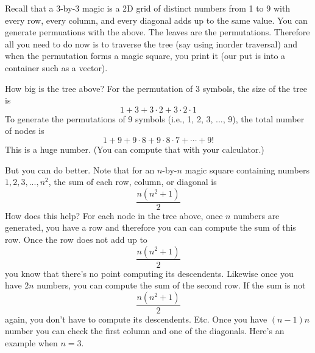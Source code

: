 Recall that a 3-by-3  magic is a 2D grid of distinct numbers
from 1 to 9 with every row,
every column, and every diagonal adds up to the same value.
You can generate permuations with the above.
The leaves are the permutations.
Therefore all you need to do now is to traverse the tree (say using
inorder traversal) and when the permutation forms a magic square,
you print it (our put is into a container such as a vector).

How big is the tree above?
For the permutation of 3 symbols, the size of the tree is
\[
1 + 3  + 3 \cdot 2 + 3 \cdot 2 \cdot 1
\]
To generate the permutations of 9 symbols (i.e., 1, 2, 3, ..., 9),
the total number of nodes is
\[
1 + 9 + 9 \cdot 8 + 9 \cdot 8 \cdot 7 + \cdots + 9!
\]
This is a huge number. (You can compute that with your calculator.)

But you can do better.
Note that for an $n$-by-$n$ magic square containing
numbers $1, 2, 3, ..., n^2$,
the sum of each row, column, or diagonal is 
\[
\frac{n(n^2 + 1)}{2}
\]
How does this help?
For each node in the tree above, once $n$ numbers are generated,
you have a row and therefore you can can compute the sum of this row.
Once the row does not add up to
\[
\frac{n(n^2 + 1)}{2}
\]
you know that there's no point computing its descendents.
Likewise once you have $2n$ numbers, you can compute the sum of the 
second row.
If the sum is not
\[
\frac{n(n^2 + 1)}{2}
\]
again, you don't have to compute its descendents.
Etc.
Once you have $(n-1)n$ number you can check the first column and 
one of the diagonals.
Here's an example when $n = 3$.

